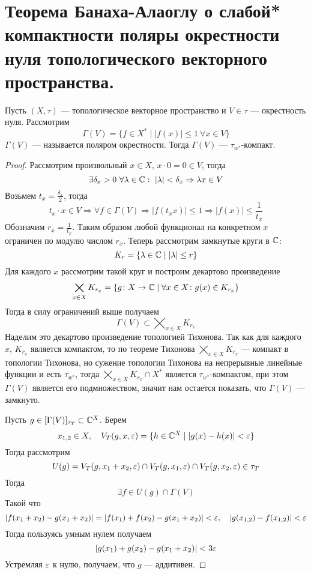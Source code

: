 \newpage
\section{Теорема Банаха-Алаоглу о слабой* компактности поляры окрестности нуля топологического векторного пространства.}


\begin{theorem}\label{th:banach-alaoglu}
	Пусть $(X,\tau)$ --- топологическое векторное пространство и $ V\in \tau$ --- окрестность нуля. Рассмотрим
	$$
	\Gamma(V) = \{ f\in X^* \mid |f(x)| \leq 1  \ \forall x \in V\}
	$$
	$\Gamma(V)$ --- называется поляром окрестности. Тогда $\Gamma(V)$ --- $\tau_{w^*}$-компакт.
\end{theorem}
\begin{proof}
	Рассмотрим произвольный $x \in X$, $x\cdot 0 = 0 \in V$, тогда 
	$$
	\exists \delta_x > 0 \ \forall \lambda \in \mathbb{C} : \ |\lambda| < \delta_x \Rightarrow \lambda x \in V
	$$
	Возьмем $t_x = \frac{\delta_x}{2}$, тогда 
	$$
	t_x \cdot x \in V \Rightarrow \forall f \in \Gamma(V) \Rightarrow |f(t_x x)| \leq 1 \Rightarrow |f(x)| \leq \frac{1}{t_x}
	$$
	Обозначим $r_x = \frac{1}{t_x}$. Таким образом любой функционал на конкретном $x$ ограничен по модулю числом $r_x$. Теперь рассмотрим замкнутые круги в $\mathbb{C}$:
	$$
	K_r = \{\lambda \in \mathbb{C} \mid |\lambda| \leq r\}
	$$
	Для каждого $x$ рассмотрим такой круг и построим декартово произведение
	$$
	\bigtimes_{x\in X} K_{r_x} = \{g \colon X \to \mathbb{C} \mid \forall x \in X\colon  g(x) \in K_{r_x}\}
	$$
	Тогда в силу ограничений выше получаем 
	$$
	\Gamma(V) \subset 	\bigtimes_{x\in X} K_{r_x} 
	$$
	Наделим это декартово произведение топологией Тихонова. Так как для каждого $x$, $K_{r_x}$ является компактом, то по теореме Тихонова $	\bigtimes_{x\in X} K_{r_x} $ --- компакт в топологии Тихонова, но сужение топологии Тихонова на непрерывные линейные функции и есть $\tau_{w^*}$, тогда $	\bigtimes_{x\in X} K_{r_x}  \cap X^*$ является $\tau_{w^*}$-компактом, при этом $\Gamma(V)$ является его подмножеством, значит нам остается показать, что $\Gamma(V)$ --- замкнуто. 
	
	Пусть $ g \in [\Gamma(V)]_{\tau_T} \subset \mathbb{C}^X$. Берем 
	$$
	x_{1,2} \in X,  \quad V_T(g,x,\varepsilon) = \{h \in \mathbb{C}^X \mid |g(x) - h(x)| < \varepsilon\}
	$$
	Тогда рассмотрим 
	$$
	U(g) = V_T(g, x_1 + x_2, \varepsilon) \cap V_T(g,x_1,\varepsilon) \cap V_T(g,x_2,\varepsilon) \in \tau_T
	$$
	Тогда 
	$$
	\exists f \in U(g) \cap \Gamma(V)
	$$
	Такой что 
	$$
	|f(x_1 + x_2) - g(x_1 + x_2)| = |f(x_1) + f(x_2) - g(x_1 + x_2)| < \varepsilon, \quad|g(x_{1,2}) - f(x_{1,2})| < \varepsilon
	$$
	Тогда пользуясь умным нулем получаем
	$$
	|g(x_1) + g(x_2) - g(x_1 + x_2)| < 3\varepsilon
	$$
	Устремляя $\varepsilon$ к нулю, получаем, что $g$ --- аддитивен. 
	

\end{proof}
